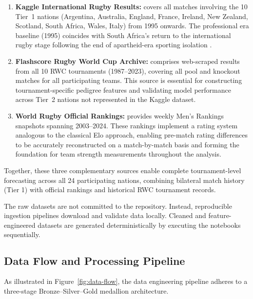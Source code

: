 \documentclass[12pt,a4paper,onecolumn]{article}
\begin{document}
\vspace{0.25cm}
\begin{enumerate}[label=\textbf{\arabic*.}, leftmargin=1.5cm, itemsep=0.5em, parsep=0.5em]
  \item \textbf{Kaggle International Rugby Results:} \cite{Begbie2022} covers all matches involving the 10 Tier~1 nations (Argentina, Australia, England, France, Ireland, New Zealand, Scotland, South Africa, Wales, Italy) from 1995 onwards. The professional era baseline (1995) coincides with South Africa's return to the international rugby stage following the end of apartheid-era sporting isolation \cite{WorldRugby1995}.
  
  \item \textbf{Flashscore Rugby World Cup Archive:} \cite{Flashscore2024} comprises web-scraped results from all 10 RWC tournaments (1987–2023), covering all pool and knockout matches for all participating teams. This source is essential for constructing tournament-specific pedigree features and validating model performance across Tier~2 nations not represented in the Kaggle dataset.
  
  \item \textbf{World Rugby Official Rankings:} \cite{WorldRugby2024} provides weekly Men's Rankings snapshots spanning 2003–2024. These rankings implement a rating system analogous to the classical Elo approach, enabling pre-match rating differences to be accurately reconstructed on a match-by-match basis and forming the foundation for team strength measurements throughout the analysis.
\end{enumerate}

\vspace{0.25cm}

Together, these three complementary sources enable complete tournament-level forecasting across all 24 participating nations, combining bilateral match history (Tier 1) with official rankings and historical RWC tournament records.

The raw datasets are not committed to the repository. Instead, reproducible ingestion pipelines download and validate data locally. Cleaned and feature-engineered datasets are generated deterministically by executing the notebooks sequentially.

\subsection{Data Flow and Processing Pipeline}

As illustrated in Figure~\ref{fig:data-flow}, the data engineering pipeline adheres to a three-stage Bronze–Silver–Gold medallion architecture. \cite{Databricks2022}
\end{document}
